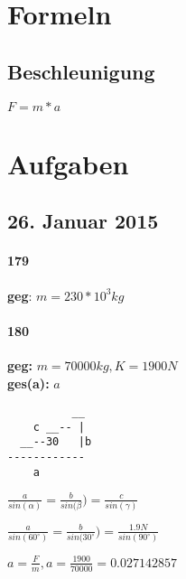 \documentclass[11pt,twoside,a4paper]{article}
\title{\titleText}
\author{\authorText}
\date{\dateText}
\begin{document}
	\maketitle
	\tableofcontents

        \section{Formeln}

        \subsection{Beschleunigung}

        \(F = m * a \)

        \section{Aufgaben}

        \subsection{26. Januar 2015}

        \paragraph{179}

        \textbf{geg}: \(m = 230 * 10^3 kg\)

        \paragraph{180}

        \textbf{geg:} \(m = 70000kg, K = 1900N\)\\
        \textbf{ges(a):} \(a\)

        \begin{verbatim}
          __
    c __-- |
  __--30   |b
------------
    a
        \end{verbatim}

        \(\frac{a}{sin(\alpha)} = \frac{b}{sin(\beta}) = \frac{c}{sin(\gamma)}\)

        \(\frac{a}{sin(60^\circ)} = \frac{b}{sin(30^\circ}) = \frac{1.9N}{sin(90^\circ)}\)

        \(a = \frac{F}{m}, a = \frac{1900}{70000} = 0.027142857\)
\end{document}
